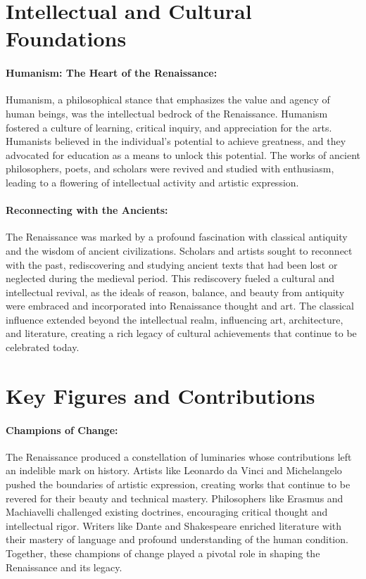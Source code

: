 \documentclass[a4paper,12pt]{book}
\begin{document}
\section*{Intellectual and Cultural Foundations}

\paragraph{Humanism: The Heart of the Renaissance:}
Humanism, a philosophical stance that emphasizes the value and agency of human beings, was the intellectual bedrock of the Renaissance. Humanism fostered a culture of learning, critical inquiry, and appreciation for the arts. Humanists believed in the individual's potential to achieve greatness, and they advocated for education as a means to unlock this potential. The works of ancient philosophers, poets, and scholars were revived and studied with enthusiasm, leading to a flowering of intellectual activity and artistic expression.

\paragraph{Reconnecting with the Ancients:}
The Renaissance was marked by a profound fascination with classical antiquity and the wisdom of ancient civilizations. Scholars and artists sought to reconnect with the past, rediscovering and studying ancient texts that had been lost or neglected during the medieval period. This rediscovery fueled a cultural and intellectual revival, as the ideals of reason, balance, and beauty from antiquity were embraced and incorporated into Renaissance thought and art. The classical influence extended beyond the intellectual realm, influencing art, architecture, and literature, creating a rich legacy of cultural achievements that continue to be celebrated today.

\section*{Key Figures and Contributions}

\paragraph{Champions of Change:}
The Renaissance produced a constellation of luminaries whose contributions left an indelible mark on history. Artists like Leonardo da Vinci and Michelangelo pushed the boundaries of artistic expression, creating works that continue to be revered for their beauty and technical mastery. Philosophers like Erasmus and Machiavelli challenged existing doctrines, encouraging critical thought and intellectual rigor. Writers like Dante and Shakespeare enriched literature with their mastery of language and profound understanding of the human condition. Together, these champions of change played a pivotal role in shaping the Renaissance and its legacy.
\end{document}
